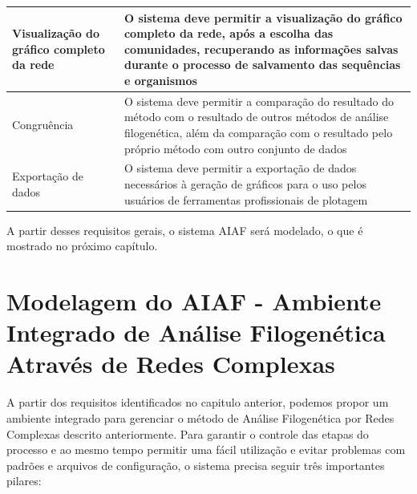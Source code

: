 \begin{table}
\begin{tabular}{p{5cm}p{10cm}}
Visualização do gráfico completo da rede & O sistema deve permitir a visualização do gráfico completo da rede, após a escolha das comunidades,
recuperando as informações salvas durante o processo de salvamento das sequências e organismos \\ \hline
Congruência & O sistema deve permitir a comparação do resultado do método com o resultado de outros métodos de análise filogenética, além da comparação
com o resultado pelo próprio método com outro conjunto de dados \\ \hline
Exportação de dados & O sistema deve permitir a exportação de dados necessários à geração de gráficos para o uso pelos usuários de ferramentas
profissionais de plotagem \\ \hline
\end{tabular}
\label{tab:requisitos}
\end{table} 

A partir desses requisitos gerais, o sistema AIAF será modelado, o que é mostrado no próximo capítulo.


\chapter{Modelagem do AIAF - Ambiente Integrado de Análise Filogenética Através de Redes Complexas}
\label{cap:navi}


A partir dos requisitos identificados no capitulo anterior, podemos propor um ambiente integrado para gerenciar o método de Análise Filogenética por
Redes Complexas descrito anteriormente. Para garantir o controle das etapas do processo e ao mesmo tempo permitir uma fácil utilização e evitar problemas
com padrões e arquivos de configuração, o sistema precisa seguir três importantes pilares:

